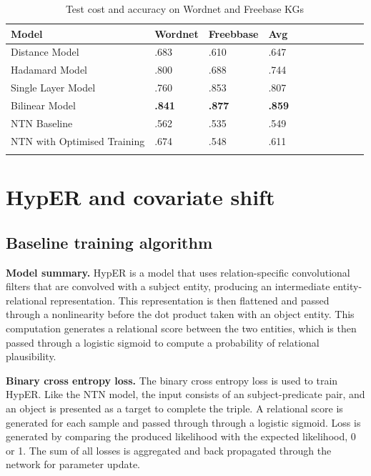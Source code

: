 \begin{table}[H]
	\centering
	\begin{tabular}{lllllllllll}
  		\textbf{Model} & \textbf{Wordnet} & \textbf{Freebbase} & \textbf{Avg} \\
  		\hline
  		Distance Model & .683 & .610 & .647 \\
  		Hadamard Model & .800 & .688 & .744 \\
  		Single Layer Model & .760 & .853 & .807 \\
  		Bilinear Model & \textbf{.841} & \textbf{.877} & \textbf{.859} \\
  		NTN Baseline & .562 & .535 & .549 \\
  		\hline
  		NTN with Optimised Training & .674 & .548 & .611 \\
		&
	\end{tabular}
	\caption{Test cost and accuracy on Wordnet and Freebase KGs}
\end{table}



\section{HypER and covariate shift}

\subsection{Baseline training algorithm}
\textbf{Model summary.} HypER is a model that uses relation-specific convolutional filters that are convolved with a subject entity, producing an intermediate entity-relational representation. This representation is then flattened and passed through a nonlinearity before the dot product taken with an object entity. This computation generates a relational score between the two entities, which is then passed through a logistic sigmoid to compute a probability of relational plausibility. \par

\noindent \textbf{Binary cross entropy loss.} The binary cross entropy loss is used to train HypER. Like the NTN model, the input consists of an subject-predicate pair, and an object is presented as a target to complete the triple. A relational score is generated for each sample and passed through through a logistic sigmoid. Loss is generated by comparing the produced likelihood with the expected likelihood, 0 or 1. The sum of all losses is aggregated and back propagated through the network for parameter update. \par


